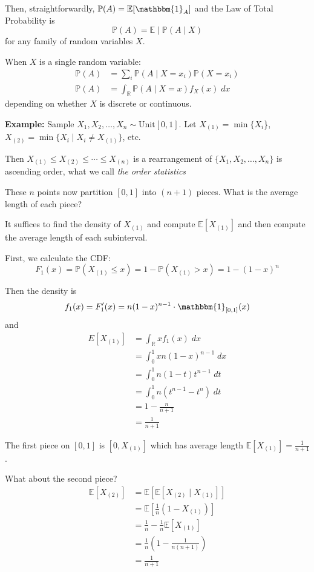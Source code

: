 \documentclass[12pt]{report}
\renewcommand{\P}{\mathbb{P}}
\newcommand{\R}{\mathbb{R}}
\newcommand{\E}{\mathbb{E}}
\newcommand{\ind}{\mathbbm{1}}
\begin{document}
    Then, straightforwardly, $\P(A) = \E[\ind_A]$ and the Law of Total Probability is 
    \[\P(A) = \E \; | \; \P(A \; | \; X)\] 
    for any family of random variables $X$. 
    
    When $X$ is a single random variable: 
    \begin{align*}
        \P(A) &= \sum_i \P(A \; | \; X = x_i) \P(X = x_i)\\ 
        \P(A) &= \int_{\R} \P(A \; | \; X= x) f_X(x)\; dx
    \end{align*}
    depending on whether $X$ is discrete or continuous.

    \textbf{Example:} Sample $X_1, X_2, \dots, X_n \sim \text{Unit}[0, 1]$. Let $X_{(1)} = \min \{X_i$\}, $X_{(2)} = \min\{X_i \; | \; X_i \neq X_{(1)}\}$, etc.

    Then $X_{(1)} \leq X_{(2)} \leq \cdots \leq X_{(n)}$ is a rearrangement of $\{X_1, X_2, \dots, X_n\}$ is ascending order, what we call \emph{the order statistics} 

    These $n$ points now partition $[0, 1]$ into $(n+1)$ pieces. What is the average length of each piece? 

    It suffices to find the density of $X_{(1)}$ and compute $\E[X_{(1)}]$ and then compute the average length of each subinterval.

    First, we calculate the CDF:
    \[F_1(x) = \P(X_{(1)} \leq x) = 1 - \P(X_{(1)} > x) = 1 - (1 - x)^n\] 

    Then the density is
    \[f_1(x) = F_1'(x) = n(1-x)^{n-1} \cdot \ind_{[0, 1]}(x)\] 
    and 
    \begin{align*}
        E[X_{(1)}] &= \int_{\R} x f_1(x) \; dx\\ 
            &= \int_0^1 x n(1-x)^{n-1} \; dx\\
            &= \int_0^1 n(1 - t)t^{n-1}\; dt\\ 
            &= \int_0^1 n(t^{n-1} - t^n)\; dt\\ 
            &= 1 - \frac{n}{n+1}\\ 
            &= \frac{1}{n+1}
    \end{align*}

    The first piece on $[0, 1]$ is $[0, X_{(1)}]$ which has average length $\E[X_{(1)}] = \frac{1}{n + 1}$. 

    What about the second piece? 
    \begin{align*}
        \E[X_{(2)}] &= \E[\E[X_{(2)} \; | \; X_{(1)}]] \\ 
        &= \E[\frac{1}{n}(1 - X_{(1)})]\\ 
        &= \frac{1}{n} - \frac{1}{n}\E[X_{(1)}]\\
        &= \frac{1}{n}\left(1 - \frac{1}{n(n+1)}\right)\\
        &= \frac{1}{n+1}
    \end{align*}
\end{document}
